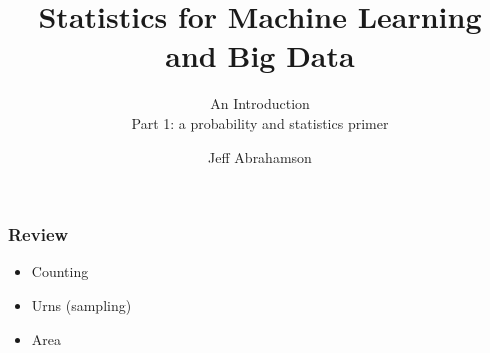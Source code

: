 

\title
{Statistics for Machine Learning and Big Data}
\subtitle{An Introduction\\[6mm] Part 1: a probability and statistics primer}

\author[Abrahamson] {Jeff Abrahamson}




\begin{frame}
  \titlepage
\end{frame}


\begin{frame}
  \frametitle{Review}
  \begin{itemize}
  \item Counting
  \item Urns (sampling)
  \item Area
  \end{itemize}
\end{frame}

